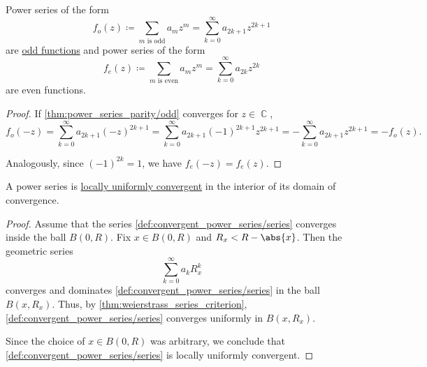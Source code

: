 \begin{proposition}\label{thm:power_series_parity}
  Power series of the form
  \begin{equation}\label{thm:power_series_parity/odd}
    f_o(z) \coloneqq \sum_{m \text{ is odd}} a_m z^m = \sum_{k=0}^\infty a_{2k+1} z^{2k+1}
  \end{equation}
  are \hyperref[def:real_function_parity]{odd functions} and power series of the form
  \begin{equation}\label{thm:power_series_parity/even}
    f_e(z) \coloneqq \sum_{m \text{ is even}} a_m z^m = \sum_{k=0}^\infty a_{2k} z^{2k}
  \end{equation}
  are even functions.
\end{proposition}
\begin{proof}
  If \eqref{thm:power_series_parity/odd} converges for \( z \in \BbbC \),
  \begin{equation*}
    f_o(-z)
    =
    \sum_{k=0}^\infty a_{2k+1} (-z)^{2k+1}
    =
    \sum_{k=0}^\infty a_{2k+1} (-1)^{2k+1} z^{2k+1}
    =
    - \sum_{k=0}^\infty a_{2k+1} z^{2k+1}
    =
    - f_o(z).
  \end{equation*}

  Analogously, since \( (-1)^{2k} = 1 \), we have \( f_e(-z) = f_e(z) \).
\end{proof}

\begin{proposition}\label{thm:power_series_are_locally_uniform_convergent}
  A power series is \hyperref[def:function_net_convergence/locally_uniform]{locally uniformly convergent} in the interior of its domain of convergence.
\end{proposition}
\begin{proof}
  Assume that the series \eqref{def:convergent_power_series/series} converges inside the ball \( B(0, R) \). Fix \( x \in B(0, R) \) and \( R_x < R - \abs{x} \). Then the geometric series
  \begin{equation*}
    \sum_{k=0}^\infty a_k R_x^k
  \end{equation*}
  converges and dominates \eqref{def:convergent_power_series/series} in the ball \( B(x, R_x) \). Thus, by \cref{thm:weierstrass_series_criterion}, \eqref{def:convergent_power_series/series} converges uniformly in \( B(x, R_x) \).

  Since the choice of \( x \in B(0, R) \) was arbitrary, we conclude that \eqref{def:convergent_power_series/series} is locally uniformly convergent.
\end{proof}

